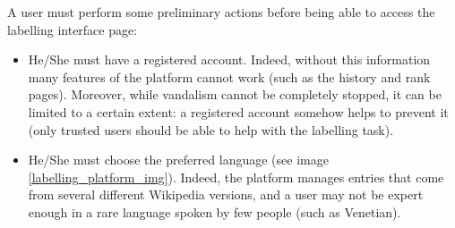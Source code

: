             A user must perform some preliminary actions before being able to access the labelling interface page:
            \begin{itemize}
                \item He/She must have a registered account. Indeed, without this information many features of the platform cannot work (such as the history and rank pages). Moreover, while vandalism cannot be completely stopped, it can be limited to a certain extent: a registered account somehow helps to prevent it (only trusted users should be able to help with the labelling task).
                \item He/She must choose the preferred language (see image \ref{labelling_platform_img}). Indeed, the platform manages entries that come from several different Wikipedia versions, and a user may not be expert enough in a rare language spoken by few people (such as Venetian). 
            \end{itemize}
            

